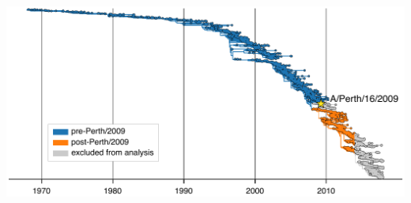 \documentclass[9pt,twocolumn,twoside]{pnas-new-for-biorxiv}
\begin{document}
\begin{suppfigure}[H]
\centerline{\includegraphics[width=1.0\textwidth]{figs/supp_H3N2_phylogeny/H3N2_phylogeny.pdf}}
\caption{\label{suppfig:tree}
{\bf A phylogenetic tree of all HA sequences used in our analysis of mutation frequencies.}
HA sequences were sampled at a rate of six viruses per month from January 1, 1968 through February 1, 2018.
The Perth/2009 strain used in our experiments is indicated.
The rest of the tree is partitioned into nodes that preceded the split of the Perth/2009 strain from the trunk of the tree (blue) and nodes that branched off the trunk after the clade containing Perth/2009 (orange).
In Figure~\ref{fig:muteffect_maxfreq}, these two partitions of the tree are analyzed separately.
Nodes in the clade containing the Perth/2009 strain and nodes sampled in 2014 or after were excluded from our analyses.
The Perth/2009 strain was excluded to avoid artifacts related to mutations that occurred on the branches leading to the HA sequence used in the experiment.
The post-2014 nodes were excluded because the evolutionary fates of many sequences after this date are not yet full resolved.
}
\end{suppfigure}
\end{document}
